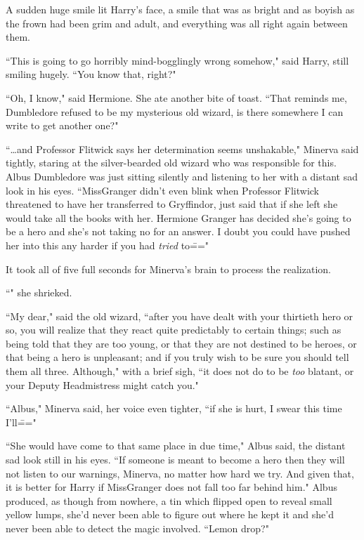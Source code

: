A sudden huge smile lit Harry's face, a smile that was as bright and as boyish as the frown had been grim and adult, and everything was all right again between them.

``This is going to go horribly mind-bogglingly wrong somehow," said Harry, still smiling hugely. ``You know that, right?"

``Oh, I know," said Hermione. She ate another bite of toast. ``That reminds me, Dumbledore refused to be my mysterious old wizard, is there somewhere I can write to get another one?"


``{\ldots}and Professor Flitwick says her determination seems unshakable," Minerva said tightly, staring at the silver-bearded old wizard who was responsible for this. Albus Dumbledore was just sitting silently and listening to her with a distant sad look in his eyes. ``Miss\?Granger didn't even blink when Professor Flitwick threatened to have her transferred to Gryffindor, just said that if she left she would take all the books with her. Hermione Granger has decided she's going to be a hero and she's not taking no for an answer. I doubt you could have pushed her into this any harder if you had \emph{tried} to\==="

It took all of five full seconds for Minerva's brain to process the realization.

``" she shrieked.

``My dear," said the old wizard, ``after you have dealt with your thirtieth hero or so, you will realize that they react quite predictably to certain things; such as being told that they are too young, or that they are not destined to be heroes, or that being a hero is unpleasant; and if you truly wish to be sure you should tell them all three. Although," with a brief sigh, ``it does not do to be \emph{too} blatant, or your Deputy Headmistress might catch you."

``Albus," Minerva said, her voice even tighter, ``if she is hurt, I swear this time I'll\==="

``She would have come to that same place in due time," Albus said, the distant sad look still in his eyes. ``If someone is meant to become a hero then they will not listen to our warnings, Minerva, no matter how hard we try. And given that, it is better for Harry if Miss\?Granger does not fall too far behind him." Albus produced, as though from nowhere, a tin which flipped open to reveal small yellow lumps, she'd never been able to figure out where he kept it and she'd never been able to detect the magic involved. ``Lemon drop?"

